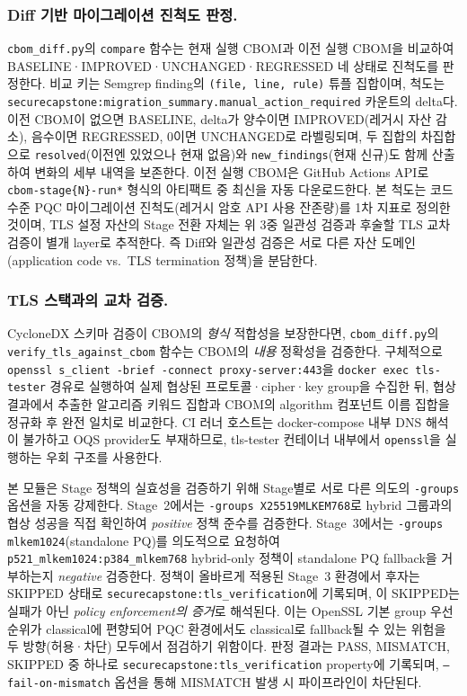 \subsubsection{Diff 기반 마이그레이션 진척도 판정.}

\texttt{cbom\_diff.py}의 \texttt{compare} 함수는 현재 실행 CBOM과 이전 실행 CBOM을 비교하여 BASELINE·IMPROVED·UNCHANGED·REGRESSED 네 상태로 진척도를 판정한다.
비교 키는 Semgrep finding의 \texttt{(file, line, rule)} 튜플 집합이며, 척도는 \texttt{securecapstone:migration\_summary.manual\_action\_required} 카운트의 delta다.
이전 CBOM이 없으면 BASELINE, delta가 양수이면 IMPROVED(레거시 자산 감소), 음수이면 REGRESSED, 0이면 UNCHANGED로 라벨링되며, 두 집합의 차집합으로 \texttt{resolved}(이전엔 있었으나 현재 없음)와 \texttt{new\_findings}(현재 신규)도 함께 산출하여 변화의 세부 내역을 보존한다.
이전 실행 CBOM은 GitHub Actions API로 \texttt{cbom-stage\{N\}-run*} 형식의 아티팩트 중 최신을 자동 다운로드한다.
본 척도는 코드 수준 PQC 마이그레이션 진척도(레거시 암호 API 사용 잔존량)를 1차 지표로 정의한 것이며, TLS 설정 자산의 Stage 전환 자체는 위 3중 일관성 검증과 후술할 TLS 교차 검증이 별개 layer로 추적한다.
즉 Diff와 일관성 검증은 서로 다른 자산 도메인(application code vs.\ TLS termination 정책)을 분담한다.

\subsubsection{TLS 스택과의 교차 검증.}

CycloneDX 스키마 검증이 CBOM의 \emph{형식} 적합성을 보장한다면, \texttt{cbom\_diff.py}의 \texttt{verify\_tls\_against\_cbom} 함수는 CBOM의 \emph{내용} 정확성을 검증한다.
구체적으로 \texttt{openssl s\_client -brief -connect proxy-server:443}을 \texttt{docker exec tls-tester} 경유로 실행하여 실제 협상된 프로토콜·cipher·key group을 수집한 뒤, 협상 결과에서 추출한 알고리즘 키워드 집합과 CBOM의 algorithm 컴포넌트 이름 집합을 정규화 후 완전 일치로 비교한다.
CI 러너 호스트는 docker-compose 내부 DNS 해석이 불가하고 OQS provider도 부재하므로, tls-tester 컨테이너 내부에서 \texttt{openssl}을 실행하는 우회 구조를 사용한다.

본 모듈은 Stage 정책의 실효성을 검증하기 위해 Stage별로 서로 다른 의도의 \texttt{-groups} 옵션을 자동 강제한다.
Stage~2에서는 \texttt{-groups X25519MLKEM768}로 hybrid 그룹과의 협상 성공을 직접 확인하여 \emph{positive} 정책 준수를 검증한다.
Stage~3에서는 \texttt{-groups mlkem1024}(standalone PQ)를 의도적으로 요청하여 \texttt{p521\_mlkem1024:p384\_mlkem768} hybrid-only 정책이 standalone PQ fallback을 거부하는지 \emph{negative} 검증한다.
정책이 올바르게 적용된 Stage~3 환경에서 후자는 SKIPPED 상태로 \texttt{securecapstone:tls\_verification}에 기록되며, 이 SKIPPED는 실패가 아닌 \emph{policy enforcement의 증거}로 해석된다.
이는 OpenSSL 기본 group 우선순위가 classical에 편향되어 PQC 환경에서도 classical로 fallback될 수 있는 위험을 두 방향(허용·차단) 모두에서 점검하기 위함이다.
판정 결과는 PASS, MISMATCH, SKIPPED 중 하나로 \texttt{securecapstone:tls\_verification} property에 기록되며, \texttt{--fail-on-mismatch} 옵션을 통해 MISMATCH 발생 시 파이프라인이 차단된다.

